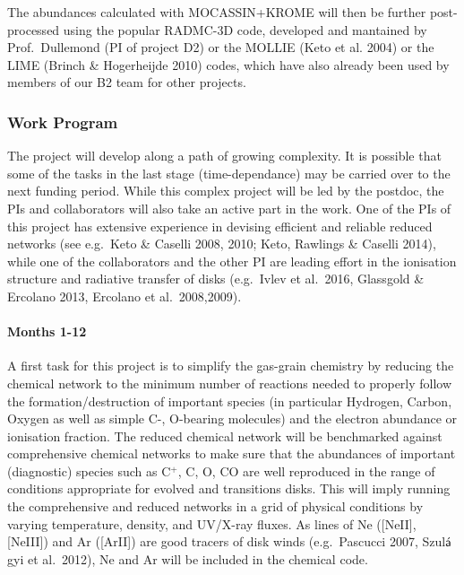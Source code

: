 \documentclass[10pt,fleqn,twoside]{article}
\begin{document}
The abundances calculated with MOCASSIN+KROME will then be further
post-processed using the popular RADMC-3D code, developed and mantained
by Prof.\ Dullemond (PI of project D2) or the MOLLIE (Keto et
al. 2004) or the LIME (Brinch \&
Hogerheijde 2010) codes, which have also already been used by members of our
B2 team for other projects. 


\subsubsection{Work Program}


The project will develop along a path of growing complexity. It is
possible that some of the tasks in the last stage (time-dependance)
may be carried over to the next funding period. While this complex
project will be led by the postdoc, the PIs and collaborators will
also take an active part in the work. One of the PIs of this project
has extensive experience in devising efficient and reliable reduced
networks (see e.g.\ Keto \& Caselli 2008, 2010; Keto, Rawlings \&
Caselli 2014), while one of the collaborators and the other PI are
leading effort in the ionisation structure and radiative transfer of
disks (e.g.\ Ivlev et al.\ 2016, Glassgold \& Ercolano 2013, Ercolano
et al.\ 2008,2009).   

\paragraph{Months 1-12}

 A first task for this
project is to simplify the gas-grain chemistry by reducing the chemical network to the minimum number of reactions needed to properly follow the formation/destruction of important species (in particular Hydrogen, Carbon, Oxygen as well as simple C-, O-bearing molecules) and the electron abundance or ionisation fraction. 
The reduced chemical network will be benchmarked against comprehensive chemical networks to make sure that the abundances of  important (diagnostic) species such as C$^+$, C, O, CO are well reproduced in the range of conditions appropriate for evolved and
transitions disks. This will imply running the comprehensive and reduced networks in a grid of physical conditions by varying temperature, density, and UV/X-ray fluxes.  As lines of Ne ([NeII], [NeIII]) and Ar ([ArII]) are good tracers of disk winds (e.g.\ Pascucci 2007, Szul$\acute{\textsf a}$gyi et al.\ 2012), Ne and Ar will be included in the chemical code. 
\end{document}
